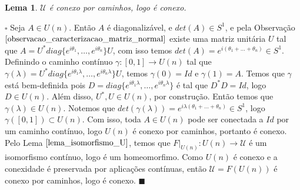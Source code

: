 \documentclass[12pt]{book}
\newtheorem{lema}[teorema]{Lema}
\newenvironment{prova}[1]{$\square$ #1}{\hfill$\blacksquare$}
\newcommand{\circulo}{S^{1}}
\newcommand{\matrizSimpleticaOrtogonal}{\mathcal{U}}
\newcommand{\matrizunitaria}[1]{U(#1)}
\begin{document}
	
	\begin{lema}\label{lema_conexidade_matriz_unitaria}
		$\matrizSimpleticaOrtogonal$ é conexo por caminhos, logo é conexo.
	\end{lema}
	\begin{prova}
		Seja $A \in \matrizunitaria{n}$. Então $A$ é diagonalizável, e $det(A) \in S^{1}$, e pela Observação $\ref{observacao_caracterizacao_matriz_normal}$ existe uma matriz unitária $U$ tal que $A=U^{*}diag\{e^{i\theta_{1}}, \dots, e^{i\theta_{n}}\}U$, com isso temos $det(A) = e^{i(\theta_{1}+\dots+\theta_{n})} \in \circulo$. Definindo o caminho contínuo $\gamma:[0,1] \to \matrizunitaria{n}$ tal que $\gamma(\lambda)=U^{*}diag\{e^{i\theta_{1}\lambda}, \dots, e^{i\theta_{n}\lambda}\}U$, temos $\gamma(0)=Id$ e $\gamma(1)=A$. Temos que $\gamma$ está bem-definida pois $D=diag\{e^{i\theta_{1}\lambda}, \dots, e^{i\theta_{n}\lambda}\}$ é tal que $D^{*}D = Id$, logo $D \in \matrizunitaria{n}$. Além disso, $U^{*}, U \in \matrizunitaria{n}$, por construção. Então temos que $\gamma(\lambda) \in \matrizunitaria{n}$. Notemos que $det(\gamma(\lambda)) = e^{i\lambda(\theta_{1}+\dots+\theta_{n})} \in \circulo$, logo $\gamma([0,1]) \subset \matrizunitaria{n}$. Com isso, toda $A \in \matrizunitaria{n}$ pode ser conectada a $Id$ por um caminho contínuo, logo $\matrizunitaria{n}$ é conexo por caminhos, portanto é conexo. Pelo Lema $\ref{lema_isomorfismo_U}$, temos que $F|_{\matrizunitaria{n}}:\matrizunitaria{n} \to \matrizSimpleticaOrtogonal$ é um isomorfismo contínuo, logo é um homeomorfimo. Como $\matrizunitaria{n}$ é conexo e a conexidade é preservada por aplicações contínuas, então $\matrizSimpleticaOrtogonal = F(\matrizunitaria{n})$ é conexo por caminhos, logo é conexo.
	\end{prova}
	
\end{document}
